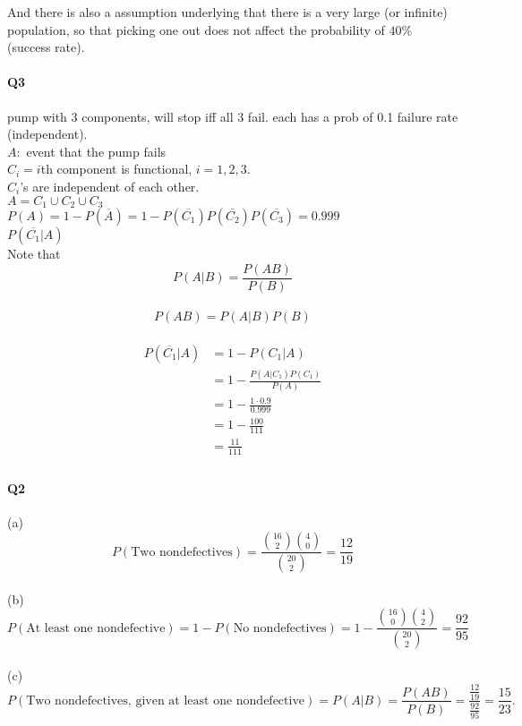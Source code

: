 \documentclass[a4paper, 11pt, twoside]{article}
\begin{document}
And there is also a assumption underlying that there is a very large (or infinite) population, so that picking one out does not affect the probability of $40\%$ (success rate).\\

\paragraph{Q3}

pump with 3 components, will stop iff all 3 fail. each has a prob of 0.1 failure rate (independent).\\

$A:$ event that the pump fails\\

$C_i = i$th component is functional, $i=1,2,3.$\\

$C_i$'s are independent of each other.\\

$A = C_1\cup C_2\cup C_3$\\

$P(A)= 1 - P(\overline{A})=1-P(\overline{C_1})P(\overline{C_2})P(\overline{C_3})=0.999$\\

$P(\overline{C_1}|A)$\\

Note that \[P(A|B)=\frac{P(AB)}{P(B)}\]\\

\[P(AB)=P(A|B)P(B)\]\\

\[
\begin{split}
	P(\overline{C_1}|A) &= 1- P(C_1|A)\\
	&=1- \frac{P(A|C_1)P(C_1)}{P(A)}\\
	&=1- \frac{1\cdot 0.9}{0.999}\\
	&= 1- \frac{100}{111}\\
	&= \frac{11}{111}\\
\end{split}
\]

\paragraph{Q2} 

(a) \[P(\text{Two nondefectives}) = \frac{{16 \choose 2}{4 \choose 0}}{{20\choose 2}}=\frac{12}{19}\]\\

(b) \[P(\text{At least one nondefective}) = 1 - P(\text{No nondefectives}) = 1 - \frac{{16 \choose 0}{4 \choose 2}}{{20\choose 2}} = \frac{92}{95}\]\\

(c) \[P(\text{Two nondefectives, given at least one nondefective}) = P(A|B) = \frac{P(AB)}{P(B)}=\frac{\frac{12}{19}}{\frac{92}{95}}=\frac{15}{23}.\]\\
\end{document}
